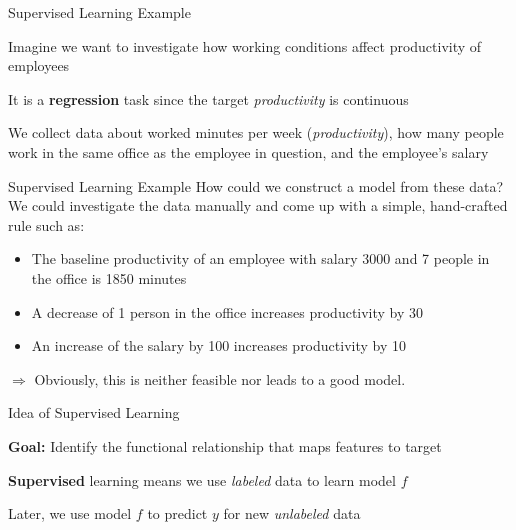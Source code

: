 \documentclass[11pt,compress,t,notes=noshow, xcolor=table]{beamer}
\begin{document}


\begin{framei}{Supervised Learning Example}
\item Imagine we want to investigate how working conditions affect productivity of employees
\item It is a \textbf{regression} task since the target \emph{productivity} is continuous
\item We collect data about worked minutes per week (\emph{productivity}), how many people work in the same office as the employee in question, and the employee's salary
\vfill
{} %
\end{framei}


\begin{framev}{Supervised Learning Example}
How could we construct a model from these data?\\
\spacer
We could investigate the data manually and come up with a simple, hand-crafted rule such as:
\spacer
\begin{itemize}
\item The baseline productivity of an employee with salary 3000 and 7 people in the office is 1850 minutes
\item A decrease of 1 person in the office increases productivity by 30
\item An increase of the salary by 100 increases productivity by 10
\end{itemize}
\vfill
$\Rightarrow$ Obviously, this is neither feasible nor leads to a good model.
\end{framev}


\begin{framei}[sep=L]{Idea of Supervised Learning}
\item \textbf{Goal:} Identify the functional relationship that maps features to target
\item \textbf{Supervised} learning means we use \emph{labeled} data to learn model $f$
\item Later, we use model $f$ to predict $y$ for new \emph{unlabeled} data
\end{framei}
\end{document}

